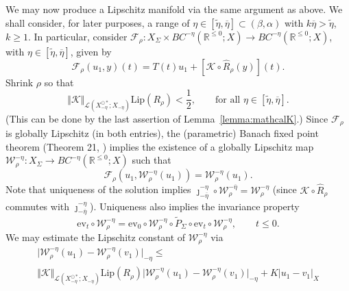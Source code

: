 \documentclass[a4paper, 12pt, oneside, reqno, notitlepage]{amsart}
\theoremstyle{plain}
\theoremstyle{definition}
\theoremstyle{remark}
\newcommand{\lip}{\mathrm{Lip}}
\begin{document}
We may now produce a Lipschitz manifold via the same argument as above.
We shall consider, for later purposes, a range of $\eta \in [\tilde{\eta},\overline{\eta}] \subset (\beta,\alpha)$  with $k\overline{\eta} > \tilde{\eta}$, $k \geq 1$.
In particular, consider $\mathcal{F}_\rho: X_\Sigma \times BC^{-\eta} (\mathbb{R}^{\leq 0};X) \to BC^{-\eta} (\mathbb{R}^{\leq 0};X)$, with $\eta \in [\tilde{\eta},\overline{\eta}]$, given by
\begin{equation}
    \mathcal{F}_\rho(u_1,y) (t)=  T(t) u_1 + [\mathcal{K} \circ \widehat{R}_\rho (y)](t).
    \label{eq:Frho}
\end{equation}
Shrink $\rho$ so that
\begin{equation}
    \Vert \mathcal{K} \Vert_{\mathcal{L}(X_{-\eta}^{\odot *};X_{-\eta})} \lip(R_\rho) < \frac{1}{2}, \qquad \text{for all } \eta \in [\widetilde{\eta},\overline{\eta}].
    \label{eq:choice_of_rho}
\end{equation}
(This can be done by the last assertion of Lemma~\ref{lemma:mathcalK}.)
Since $\mathcal{F}_\rho$ is globally Lipschitz (in both entries), the (parametric) Banach fixed point theorem (Theorem 21, \cite{Irwin72}) implies the existence of a globally Lipschitz map $\mathcal{W}_\rho^{-\eta}:X_\Sigma \to BC^{-\eta} (\mathbb{R}^{\leq 0};X)$ such that 
\begin{equation}
    \mathcal{F}_\rho(u_1,\mathcal{W}^{-\eta}_\rho(u_1)) = \mathcal{W}_\rho^{-\eta}(u_1).
    \label{eq:FrhoW}
\end{equation}
Note that uniqueness of the solution implies $\jmath_{-\overline{\eta}}^{-\eta} \circ \mathcal{W}^{-\overline\eta}_\rho = \mathcal{W}^{-\eta}_\rho$ (since $\mathcal{K} \circ \widehat{R}_\rho$ commutes with $\jmath_{-\overline{\eta}}^{-\eta}$).
Uniqueness also implies the invariance property
\begin{equation}
    \mathrm{ev}_t \circ \mathcal{W}_\rho^{-\eta} = \mathrm{ev}_0 \circ  \mathcal{W}_\rho^{-\eta}  \circ \widetilde{P}_\Sigma \circ \mathrm{ev}_t \circ\mathcal{W}_\rho^{-\eta}, \qquad t \leq 0.
    \label{eq:invariance}
\end{equation}
We may estimate the Lipschitz constant of $\mathcal{W}_\rho^{-\eta}$ via
\begin{multline*}
    \big| \mathcal{W}^{-\eta}_\rho(u_1) - \mathcal{W}^{-\eta}_\rho(v_1) \big|_{-\eta } \leq \\ \Vert \mathcal{K} \Vert_{\mathcal{L}(X_{-\eta}^{\odot *};X_{-\eta})} \lip(R_\rho) \big| \mathcal{W}^{-\eta}_\rho(u_1) - \mathcal{W}^{-\eta}_\rho(v_1) \big|_{-\eta } + K |u_1-v_1|_X
\end{multline*}
\end{document}
